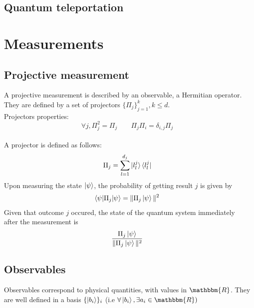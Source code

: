 \documentclass{article}
\begin{document}
\subsection{Quantum teleportation}

\section{Measurements}
\subsection{Projective measurement}
A projective measurement is described by an observable, a Hermitian operator.
They are defined by a set of projectors $\{\Pi_j\}_{j=1}^k, k \leq d$.\\
Projectors properties:
\begin{equation}
    \forall j, \Pi_j^2 = \Pi_j \qquad \Pi_j\Pi_i = \delta_{i,j}\Pi_j
\end{equation}
\\\noindent A projector is defined as follows:
\begin{equation}
    \Pi_j = \sum_{l=1}^{d_j}\ket{l_l^j}\bra{l_l^j}
\end{equation}
Upon measuring the state $\ket{\psi}$, the probability of getting result $j$ is
given by
\begin{equation}
    \braket{\psi|\Pi_j|\psi} = \| \Pi_j\ket{\psi}\|^2
\end{equation}
Given that outcome $j$ occured, the state of the quantum system immediately
after the measurement is
\begin{equation}
    \frac{\Pi_j\ket{\psi}}{\| \Pi_j\ket{\psi}\|^2}
\end{equation}

\subsection{Observables}
Observables correspond to physical quantities, with values in $\mathbbm{R}$.
They are well defined in a basis $\{\ket{b_i}\}_i$ (i.e $\forall \ket{b_i},
\exists a_i \in \mathbbm{R})$
\end{document}
